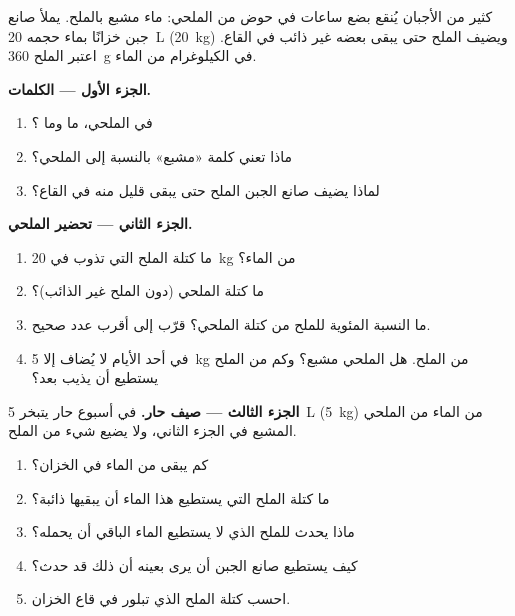 \begin{problem}
\label{pb:g6:solutions-and-solubility:1}
كثير من الأجبان يُنقع بضع ساعات في حوض من  الملحي: ماء مشبع
بالملح. يملأ صانع جبن خزانًا بماء حجمه \qty{20}{L} (\qty{20}{kg})
ويضيف الملح حتى يبقى بعضه غير ذائب في القاع. اعتبر  الملح
\qty{360}{g} في الكيلوغرام من الماء.

\medskip
\noindent\textbf{الجزء الأول --- الكلمات.}
\begin{enumerate}
  \item في  الملحي، ما  وما ؟
  \item ماذا تعني كلمة «مشبع» بالنسبة إلى  الملحي؟
  \item لماذا يضيف صانع الجبن الملح حتى يبقى قليل منه في
        القاع؟
\end{enumerate}

\medskip
\noindent\textbf{الجزء الثاني --- تحضير  الملحي.}
\begin{enumerate}[resume]
  \item ما كتلة الملح التي تذوب في \qty{20}{kg} من الماء؟
  \item ما كتلة  الملحي (دون الملح غير الذائب)؟
  \item ما النسبة المئوية للملح من كتلة  الملحي؟ قرّب إلى أقرب
        عدد صحيح.
  \item في أحد الأيام لا يُضاف إلا \qty{5}{kg} من الملح. هل  الملحي
        مشبع؟ وكم من الملح يستطيع أن يذيب بعد؟
\end{enumerate}

\medskip
\noindent\textbf{الجزء الثالث --- صيف حار.}
في أسبوع حار يتبخر \qty{5}{L} (\qty{5}{kg}) من الماء من  الملحي
المشبع في الجزء الثاني، ولا يضيع شيء من الملح.
\begin{enumerate}[resume]
  \item كم يبقى من الماء في الخزان؟
  \item ما كتلة الملح التي يستطيع هذا الماء أن يبقيها ذائبة؟
  \item ماذا يحدث للملح الذي لا يستطيع الماء الباقي أن يحمله؟
  \item كيف يستطيع صانع الجبن أن يرى بعينه أن ذلك قد
        حدث؟
  \item احسب كتلة الملح الذي تبلور في قاع
        الخزان.
\end{enumerate}
\end{problem}
